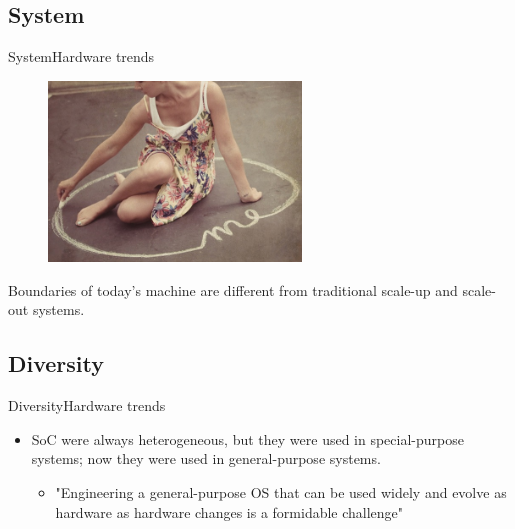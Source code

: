 \documentclass[10pt]{beamer}
\begin{document}
\subsection{System}
\begin{frame}{System}{Hardware trends}
  \begin{figure}[ht]
    \includegraphics[width=0.6\textwidth, keepaspectratio=true]{images/boundary.jpg}
  \end{figure} \pause

  \begin{block}{}
    Boundaries of today's machine are different from traditional scale-up and
    scale-out systems.
   \end{block}
\end{frame}

\subsection{Diversity}
\begin{frame}{Diversity}{Hardware trends}
  \begin{itemize}
    \item SoC were always heterogeneous, but they were used in special-purpose
          systems; now they were used in general-purpose systems.
      \begin{itemize}
        \item "Engineering a general-purpose OS that can be used widely and
             evolve as hardware as hardware changes is a formidable challenge"
      \end{itemize}
   \end{itemize}
\end{frame}

\end{document}
